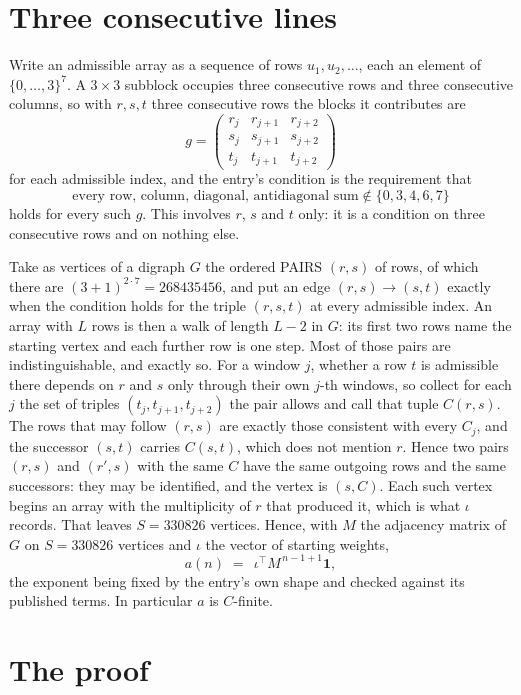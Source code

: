 \documentclass[11pt,a4paper]{article}
\theoremstyle{plain}
\theoremstyle{definition}
\begin{document}
\section{Three consecutive lines}

Write an admissible array as a sequence of rows $u_1,u_2,\dots$, each an element of
$\{0,\dots,3\}^{7}$. A $3\times3$ subblock occupies three consecutive rows and
three consecutive columns, so with $r,s,t$ three consecutive rows the blocks it
contributes are
\[
g=\begin{pmatrix}r_j&r_{j+1}&r_{j+2}\\ s_j&s_{j+1}&s_{j+2}\\ t_j&t_{j+1}&t_{j+2}\end{pmatrix}
\]
for each admissible index, and the entry's condition is the requirement that
\[
\text{every row, column, diagonal, antidiagonal sum} \notin \{0,3,4,6,7\}
\]
holds for every such $g$. This involves $r$, $s$ and $t$ only: it is a condition on
three consecutive rows and on nothing else.

Take as vertices of a digraph $G$ the ordered PAIRS $(r,s)$ of rows, of which there are
$(3+1)^{2\cdot7}=268435456$, and put an edge $(r,s)\to(s,t)$ exactly when the condition
holds for the triple $(r,s,t)$ at every admissible index. An array with $L$ rows is then a
walk of length $L-2$ in $G$: its first two rows name the starting vertex and each further
row is one step. Most of those pairs are indistinguishable, and exactly so. For a window $j$, whether a row $t$ is admissible there depends on $r$ and $s$ only through their own $j$-th windows, so collect for each $j$ the set of triples $(t_j,t_{j+1},t_{j+2})$ the pair allows and call that tuple $C(r,s)$. The rows that may follow $(r,s)$ are exactly those consistent with every $C_j$, and the successor $(s,t)$ carries $C(s,t)$, which does not mention $r$. Hence two pairs $(r,s)$ and $(r',s)$ with the same $C$ have the same outgoing rows and the same successors: they may be identified, and the vertex is $(s,C)$. Each such vertex begins an array with the multiplicity of $r$ that produced it, which is what $\iota$ records. That leaves $S=330826$ vertices. Hence, with $M$ the adjacency matrix of $G$ on $S=330826$ vertices and
$\iota$ the vector of starting weights,
\[
a(n)\;=\;\,\iota^{\!\top}M^{\,n-1+1}\mathbf{1},
\]
the exponent being fixed by the entry's own shape and checked against its published terms.
In particular $a$ is $C$-finite.

\section{The proof}
\end{document}
